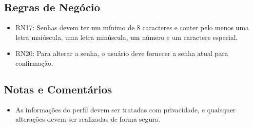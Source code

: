 \subsection*{Regras de Negócio}
\begin{addmargin}[1.5cm]{0cm}
    \begin{itemize}
        \item RN17: Senhas devem ter um mínimo de 8 caracteres e conter pelo menos uma letra maiúscula, uma letra minúscula, um número e um caractere especial.
        \item RN20: Para alterar a senha, o usuário deve fornecer a senha atual para confirmação.
    \end{itemize}
\end{addmargin}

\subsection*{Notas e Comentários}
\begin{addmargin}[1.5cm]{0cm}
    \begin{itemize}
        \item As informações do perfil devem ser tratadas com privacidade, e quaisquer alterações devem ser realizadas de forma segura.
    \end{itemize}
\end{addmargin}

